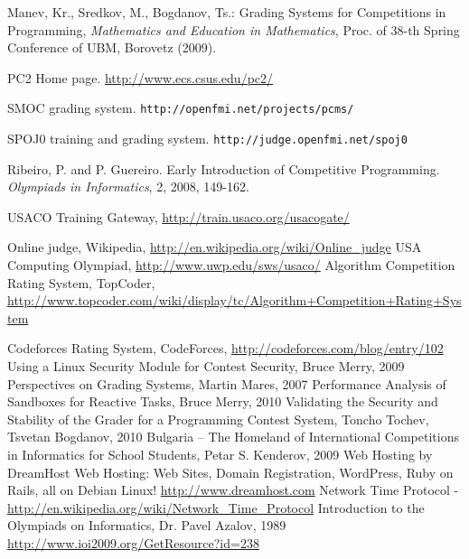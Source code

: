 \documentclass[a4paper,12pt]{article}
\begin{document}
  \newpage
  
  \begin{thebibliography}{99}

      Manev, Kr.,  Sredkov, M., Bogdanov, Ts.: Grading Systems for Competitions in Programming, \textit{Mathematics and Education in Mathematics}, Proc. of 38-th Spring Conference of UBM, Borovetz (2009). 
    
      PC2 Home page. \url{http://www.ecs.csus.edu/pc2/}

      SMOC grading system. \texttt{http://openfmi.net/projects/pcms/}

      SPOJ0 training and grading system. \texttt{http://judge.openfmi.net/spoj0}

      Ribeiro, P. and P. Guereiro. Early Introduction of Competitive Programming. \textit{Olympiads in Informatics}, 2, 2008, 149-162.

     USACO Training Gateway, \url{http://train.usaco.org/usacogate/}
    
      Online judge, Wikipedia, \url{http://en.wikipedia.org/wiki/Online_judge}
      USA Computing Olympiad, \url{http://www.uwp.edu/sws/usaco/}
      Algorithm Competition Rating System, TopCoder, \url{http://www.topcoder.com/wiki/display/tc/Algorithm+Competition+Rating+System}
      
      Codeforces Rating System, CodeForces, \url{http://codeforces.com/blog/entry/102}
      Using a Linux Security Module for Contest Security, Bruce Merry, 2009
      Perspectives on Grading Systems, Martin Mares, 2007
      Performance Analysis of Sandboxes for Reactive Tasks, Bruce Merry, 2010
      Validating the Security and Stability of the Grader for a Programming Contest System, Toncho Tochev, Tsvetan Bogdanov, 2010
      Bulgaria – The Homeland of International Competitions in Informatics for School Students, Petar S. Kenderov, 2009
      Web Hosting by DreamHost Web Hosting: Web Sites, Domain Registration, WordPress, Ruby on Rails, all on Debian Linux! \url{http://www.dreamhost.com}
      Network Time Protocol - \url{http://en.wikipedia.org/wiki/Network_Time_Protocol}
      Introduction to the Olympiads on Informatics, Dr. Pavel Azalov, 1989 \url{http://www.ioi2009.org/GetResource?id=238}
      

\end{thebibliography}
\end{document}
